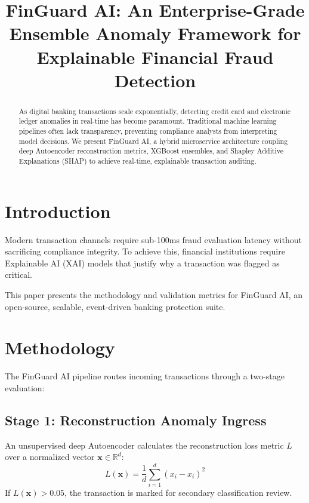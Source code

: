 \documentclass[conference]{IEEEtran}
\begin{document}
\title{FinGuard AI: An Enterprise-Grade Ensemble Anomaly Framework for Explainable Financial Fraud Detection}

\author{
}

\maketitle

\begin{abstract}
As digital banking transactions scale exponentially, detecting credit card and electronic ledger anomalies in real-time has become paramount. Traditional machine learning pipelines often lack transparency, preventing compliance analysts from interpreting model decisions. We present FinGuard AI, a hybrid microservice architecture coupling deep Autoencoder reconstruction metrics, XGBoost ensembles, and Shapley Additive Explanations (SHAP) to achieve real-time, explainable transaction auditing.
\end{abstract}

\section{Introduction}
Modern transaction channels require sub-100ms fraud evaluation latency without sacrificing compliance integrity. To achieve this, financial institutions require Explainable AI (XAI) models that justify why a transaction was flagged as critical.

This paper presents the methodology and validation metrics for FinGuard AI, an open-source, scalable, event-driven banking protection suite.

\section{Methodology}
The FinGuard AI pipeline routes incoming transactions through a two-stage evaluation:

\subsection{Stage 1: Reconstruction Anomaly Ingress}
An unsupervised deep Autoencoder calculates the reconstruction loss metric $L$ over a normalized vector $\mathbf{x} \in \mathbb{R}^d$:
\begin{equation}
L(\mathbf{x}) = \frac{1}{d} \sum_{i=1}^d (x_i - \hat{x}_i)^2
\end{equation}
If $L(\mathbf{x}) > 0.05$, the transaction is marked for secondary classification review.
\end{document}
